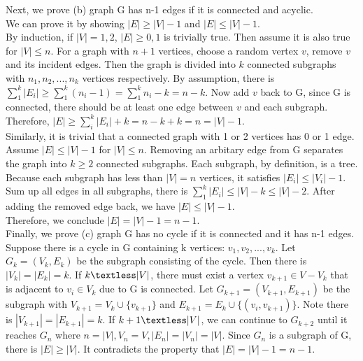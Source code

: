\documentclass[titlepage, paper=a4, fontsize=11pt]{scrartcl} %
\numberwithin{equation}{section} %
\numberwithin{figure}{section} %
\numberwithin{table}{section} %
\begin{document}
Next, we prove (b) graph G has n-1 edges if it is connected and acyclic. \\
We can prove it by showing $|E| \geq |V| -1$ and $|E| \leq |V| -1$. \\
By induction, if $|V|=1,2$, $|E| \geq 0,1$ is trivially true. Then assume it is also true for $|V| \leq n$. For a graph with $n+1$ vertices, choose a random vertex $v$, remove $v$ and its incident edges. Then the graph is divided into $k$ connected subgraphs with $n_1, n_2, ... , n_k$ vertices respectively. By assumption, there is $\sum_1^k |E_i| \geq \sum_1^k (n_i -1)=\sum_1^k n_i - k = n-k$. Now add $v$ back to G, since G is connected, there should be at least one edge between $v$ and each subgraph. Therefore,
$|E| \geq \sum_i^k |E_i| + k = n-k+k = n = |V| - 1$. \\
Similarly, it is trivial that a connected graph with 1 or 2 vertices has 0 or 1 edge. Assume $|E| \leq |V| -1$ for $|V| \leq n$. Removing an arbitary edge from G separates the graph into $k \geq 2$ connected subgraphs. Each subgraph, by definition, is a tree. Because each subgraph has less than $|V|=n$ vertices, it satisfies $|E_i| \leq |V_i| - 1$. Sum up all edges in all subgraphs, there is $\sum_1^k |E_i| \leq |V| - k \leq |V| - 2$. After adding the removed edge back, we have $|E| \leq |V| - 1$. \\
Therefore, we conclude $|E| = |V| - 1 = n-1$. \\

Finally, we prove (c) graph G has no cycle if it is connected and it has n-1 edges. \\
Suppose there is a cycle in G containing k vertices: $v_1, v_2, ... , v_k$. Let $G_k = (V_k, E_k)$ be the subgraph consisting of the cycle. Then there is $|V_k| = |E_k| = k$. If $k \textless |V|$, there must exist a vertex $v_{k+1} \in V - V_k$ that is adjacent to $v_i \in V_k$ due to G is connected. Let $G_{k+1} = (V_{k+1}, E_{k+1})$ be the subgraph with $V_{k+1} = V_k \cup \{v_{k+1}\}$ and $E_{k+1} = E_k \cup \{(v_i, v_{k+1})\}$. Note there is $|V_{k+1}| = |E_{k+1}| = k$. If $k+1 \textless |V|$, we can continue to $G_{k+2}$ until it reaches $G_n$ where $n=|V|, V_n=V, |E_n|=|V_n|=|V|$. Since $G_n$ is a subgraph of G, there is $|E| \geq |V|$. It contradicts the property that $|E|=|V|-1=n-1$. \\




\end{document}
